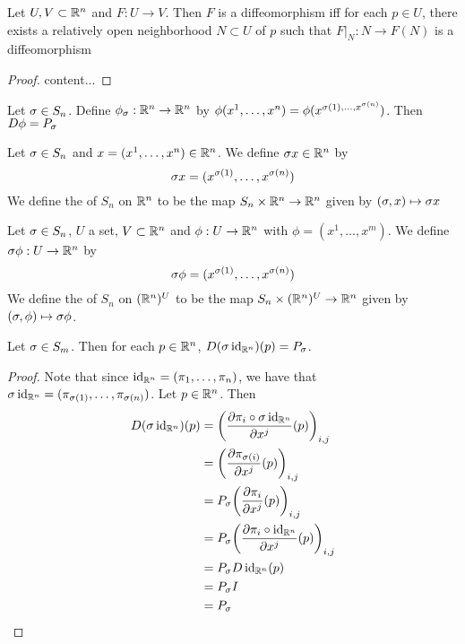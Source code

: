 \documentclass{book}
\begin{document}
	\begin{ex}
		Let $U,V \subset \mathbb{R}^n$ and $F: U \rightarrow V$. Then $F$ is a diffeomorphism iff for each $p \in U$, there exists a relatively open neighborhood $N \subset U$ of $p$ such that $F|_N:N \rightarrow F(N)$ is a diffeomorphism
	\end{ex}
	
	\begin{proof}
		content...
	\end{proof}

	\begin{ex}
		Let $\sigma \in S_n$. Define $\phi_{\sigma}: \mathbb{R}^n \rightarrow \mathbb{R}^n$ by $\phi(x^1, \ldots, x^n) = \phi(x^{\sigma(1), \ldots, x^{\sigma(n)}})$. Then $D \phi = P_{\sigma}$
	\end{ex}

	\begin{defn}
		Let $\sigma \in S_n$ and $x = (x^1, \ldots, x^n) \in \mathbb{R}^n$. We define $\sigma x \in \mathbb{R}^n$ by 
		$$\sigma x = (x^{\sigma(1)}, \ldots, x^{\sigma(n)})$$
		We define the  of $S_n$ on $\mathbb{R}^n$ to be the map $S_n \times \mathbb{R}^n \rightarrow \mathbb{R}^n$ given by $(\sigma, x) \mapsto \sigma x$
	\end{defn}

	\begin{defn}
		Let $\sigma \in S_n$, $U$ a set, $V \subset \mathbb{R}^n$ and $\phi: U \rightarrow \mathbb{R}^n$ with $\phi = (x^1, \ldots, x^m)$. We define $\sigma \phi: U \rightarrow \mathbb{R}^n$ by 
		$$\sigma \phi = (x^{\sigma(1)}, \ldots, x^{\sigma(n)})$$
		We define the  of $S_n$ on $(\mathbb{R}^n)^{U}$ to be the map $S_n \times (\mathbb{R}^n)^{U} \rightarrow \mathbb{R}^n$ given by $(\sigma, \phi) \mapsto \sigma \phi$.
	\end{defn}

	\begin{ex}
		Let $\sigma \in S_m$. Then for each $p \in \mathbb{R}^n$, $D(\sigma \operatorname{id}_{\mathbb{R}^n})(p) = P_{\sigma}$. 
	\end{ex}

	\begin{proof}
		Note that since $\operatorname{id}_{\mathbb{R}^n} = (\pi_1, \ldots, \pi_n)$, we have that $\sigma \operatorname{id}_{\mathbb{R}^n} = (\pi_{\sigma(1)}, \ldots, \pi_{\sigma(n)})$. Let $p \in \mathbb{R}^n$. Then 
		\begin{align*}
			D(\sigma \operatorname{id}_{\mathbb{R}^n})(p) 
			& = \bigg( \frac{\partial  \pi_{i} \circ \sigma \operatorname{id}_{\mathbb{R}^n}}{\partial x^j}(p) \bigg)_{i,j} \\
			& = \bigg( \frac{\partial \pi_{\sigma(i)}}{\partial x^j}(p) \bigg)_{i,j} \\
			& = P_{\sigma} \bigg( \frac{\partial \pi_{i}}{\partial x^j}(p) \bigg)_{i,j} \\
			& = P_{\sigma} \bigg( \frac{\partial \pi_{i} \circ \operatorname{id}_{\mathbb{R}^n} }{\partial x^j}(p) \bigg)_{i,j} \\
			& = P_{\sigma} D \operatorname{id}_{\mathbb{R}^n}(p) \\
			& = P_{\sigma} I \\
			& = P_{\sigma}
		\end{align*} 
	\end{proof}
\end{document}
